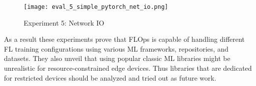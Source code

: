 \begin{figure}[H]
    \begin{adjustwidth}{-0.2\paperwidth}{-0.2\paperwidth}
        \centering
        \texttt{[image: eval\_5\_simple\_pytorch\_net\_io.png]}
        \caption{Experiment 5: Network IO}
        \label{fig:eval_5_net_io}
    \end{adjustwidth}
\end{figure}

As a result these experiments prove that FLOps is capable of handling different FL training configurations using various ML frameworks, repositories, and datasets.
They also unveil that using popular classic ML libraries might be unrealistic for resource-constrained edge devices.
Thus libraries that are dedicated for restricted devices should be analyzed and tried out as future work.